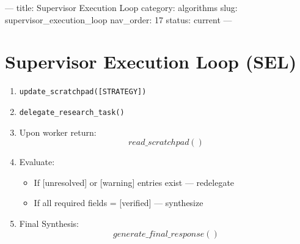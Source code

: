 ---
title: Supervisor Execution Loop
category: algorithms
slug: supervisor_execution_loop
nav_order: 17
status: current
---

\section{Supervisor Execution Loop (SEL)}

\begin{enumerate}

\item \texttt{update\_scratchpad([STRATEGY])}

\item \texttt{delegate\_research\_task()}

\item Upon worker return:
\[
read\_scratchpad()
\]

\item Evaluate:

\begin{itemize}
    \item If [unresolved] or [warning] entries exist — redelegate
    \item If all required fields = [verified] — synthesize
\end{itemize}

\item Final Synthesis:
\[
generate\_final\_response()
\]

\end{enumerate}